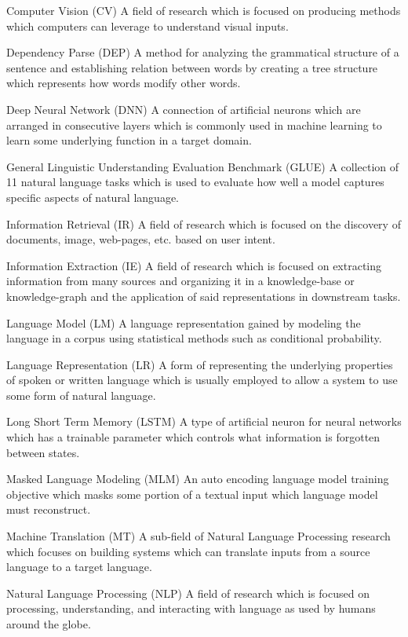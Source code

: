 \documentclass [11pt, proquest] {uwthesis}[2020/12/20]
\begin{document}
\begin{glossary}
\item[Computer Vision (CV)] A field of research which is focused on producing methods which computers can leverage to understand visual inputs.
\item[Dependency Parse (DEP)] A method for analyzing the grammatical structure of a sentence and establishing relation between words by creating a tree structure which represents how words modify other words.
\item[Deep Neural Network (DNN)] A connection of artificial neurons which are arranged in consecutive layers which is commonly used in machine learning to learn some underlying function in a target domain.
\item[General Linguistic Understanding Evaluation Benchmark (GLUE)] A collection of 11 natural language tasks which is used to evaluate how well a model captures specific aspects of natural language.
\item[Information Retrieval (IR)] A field of research which is focused on the discovery of documents, image, web-pages, etc. based on user intent.
\item[Information Extraction (IE)] A field of research which is focused on extracting information from many sources and organizing it in a knowledge-base or knowledge-graph and the application of said representations in downstream tasks.
\item[Language Model (LM)] A language representation gained by modeling the language in a corpus using statistical methods such as conditional probability.
\item[Language Representation (LR)] A form of representing the underlying properties of spoken or written language which is usually employed to allow a system to use some form of natural language.
\item[Long Short Term Memory (LSTM)] A type of artificial neuron for neural networks which has a trainable parameter which controls what information is forgotten between states.
\item[Masked Language Modeling (MLM)] An auto encoding language model training objective which masks some portion of a textual input which language model must reconstruct. 
\item[Machine Translation (MT)] A sub-field of Natural Language Processing research which focuses on building systems which can translate inputs from a source language to a target language.
\item[Natural Language Processing (NLP)] A field of research which is focused on processing, understanding, and interacting with language as used by humans around the globe.

\end{glossary}
\end{document}

